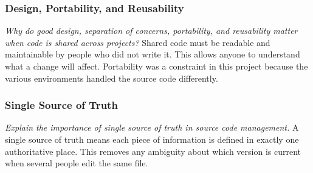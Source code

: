 \subsubsection{Design, Portability, and Reusability}
\emph{Why do good design, separation of concerns, portability, and reusability
matter when code is shared across projects?}
Shared code must be readable and maintainable by people who did not write it.
This allows anyone to understand what a change will affect.
Portability was a constraint in this project because the various environments
handled the source code differently.

\subsubsection{Single Source of Truth}
\emph{Explain the importance of single source of truth in source code
management.}
A single source of truth means each piece of information is defined in exactly
one authoritative place.
This removes any ambiguity about which version is current when several people
edit the same file.
